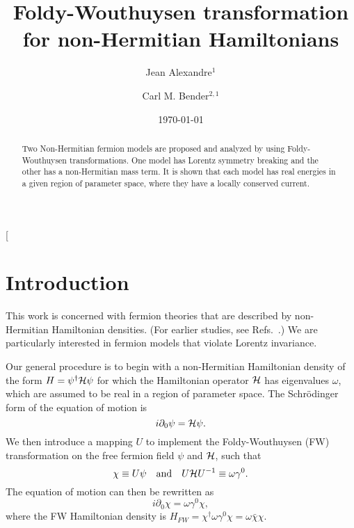 \documentclass[11pt,prd,aps,amssymb,amsmath,tightenlines,showpacs]{revtex4}
\newcommand{\cH}{{\cal H}}
\begin{document}
 
\preprint[{}
\vspace{1.0cm}
\title{Foldy-Wouthuysen transformation for non-Hermitian Hamiltonians}

\author{Jean Alexandre$^1$}

\author{Carl M. Bender$^{2,1}$}


\date{\today}

\begin{abstract}
Two Non-Hermitian fermion models are proposed and analyzed by using
Foldy-Wouthuysen transformations. One model has Lorentz symmetry breaking and
the other has a non-Hermitian mass term. It is shown that each model has real
energies in a given region of parameter space, where they have a locally
conserved current.
\end{abstract} 

\maketitle
 
\section{Introduction} 
\label{s1}
This work is concerned with fermion theories that are described by non-Hermitian
Hamiltonian densities. (For earlier studies, see Refs.~\cite{r1,r2,r3,r4}.) We
are particularly interested in fermion models that violate Lorentz invariance.

Our general procedure is to begin with a non-Hermitian Hamiltonian density of
the form $H=\psi^\dag\cH\psi$ for which the Hamiltonian operator $\cH$ has
eigenvalues $\omega$, which are assumed to be real in a region of parameter
space. The Schr\"odinger form of the equation of motion is
$$i\partial_0\psi=\cH\psi.$$
We then introduce a mapping $U$ to implement the Foldy-Wouthuysen (FW)
transformation \cite{r5} on the free fermion field $\psi$ and $\cH$, such that
$$\chi\equiv U\psi\quad\mbox{and}\quad U\cH U^{-1}\equiv\omega\gamma^0.$$
The equation of motion can then be rewritten as
$$i\partial_0\chi=\omega\gamma^0\chi,$$
where the FW Hamiltonian density is $H_{FW}=\chi^\dag\omega\gamma^0\chi=\omega
\bar\chi\chi$.
\end{document}
